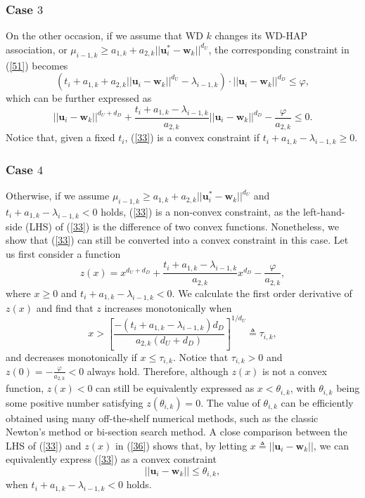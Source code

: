 \documentclass[journal, draftcls, one column, 12pt]{IEEEtran}
\begin{document}
\subsubsection{Case $3$} On the other occasion, if we assume that WD $k$ changes its WD-HAP association, or $\mu_{i-1,k}\geq a_{1,k} + a_{2,k} ||\mathbf{u}_{i}^* - \mathbf{w}_k||^{d_U}$, the corresponding constraint in (\ref{51}) becomes
\begin{equation}
\label{45}
\left(t_i + a_{1,k} + a_{2,k}||\mathbf{u}_i-\mathbf{w}_k||^{d_U} - \lambda_{i-1,k}\right)\cdot ||\mathbf{u}_i - \mathbf{w}_k||^{d_D} \leq \varphi,
\end{equation}
which can be further expressed as
\begin{equation}
\label{33}
||\mathbf{u}_i-\mathbf{w}_k||^{d_U+ d_D} + \frac{t_i+ a_{1,k}- \lambda_{i-1,k}}{a_{2,k}}||\mathbf{u}_i - \mathbf{w}_k||^{d_D} -\frac{\varphi}{a_{2,k}} \leq 0.
\end{equation}
Notice that, given a fixed $t_i$, (\ref{33}) is a convex constraint if $t_i+ a_{1,k}- \lambda_{i-1,k} \geq 0$.

\subsubsection{Case $4$}
Otherwise, if we assume $\mu_{i-1,k}\geq a_{1,k} + a_{2,k} ||\mathbf{u}_{i}^* - \mathbf{w}_k||^{d_U}$ and $t_i+ a_{1,k}- \lambda_{i-1,k} < 0$ holds, (\ref{33}) is a non-convex constraint, as the left-hand-side (LHS) of (\ref{33}) is the difference of two convex functions. Nonetheless, we show that (\ref{33}) can still be converted into a convex constraint in this case. Let us first consider a function
\begin{equation}
\label{36}
z(x) = x^{d_U+ d_D} + \frac{t_i + a_{1,k}- \lambda_{i-1,k}}{a_{2,k}}x^{d_D} -\frac{\varphi}{a_{2,k}},
\end{equation}
where $x\geq 0$ and $t_i + a_{1,k}- \lambda_{i-1,k}<0$. We calculate the first order derivative of $z(x)$ and find that $z$ increases monotonically when
\begin{equation}
\label{34}
x > \left[\frac{-\left(t_i + a_{1,k}- \lambda_{i-1,k}\right)d_D}{a_{2,k}\left(d_U+d_D\right)}\right]^{1/d_U} \triangleq \tau_{i,k},
\end{equation}
and decreases monotonically if $x\leq \tau_{i,k}$. Notice that $\tau_{i,k}>0$ and $z(0) = -\frac{\varphi}{a_{2,k}} <0$ always hold. Therefore, although $z(x)$ is not a convex function, $z(x)<0$ can still be equivalently expressed as $x<\theta_{i,k}$, with $\theta_{i,k}$ being some positive number satisfying $z(\theta_{i,k})=0$. The value of $\theta_{i,k}$ can be efficiently obtained using many off-the-shelf numerical methods, such as the classic Newton's method or bi-section search method. A close comparison between the LHS of (\ref{33}) and $z(x)$ in (\ref{36}) shows that, by letting $x \triangleq ||\mathbf{u}_i-\mathbf{w}_k||$, we can equivalently express (\ref{33}) as a convex constraint
\begin{equation}
\label{37}
||\mathbf{u}_i-\mathbf{w}_k|| \leq \theta_{i,k},
\end{equation}
when $t_i + a_{1,k}- \lambda_{i-1,k}<0$ holds.
\end{document}
